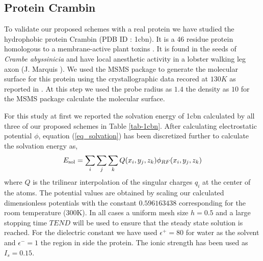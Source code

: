 \subsection{Protein Crambin } To validate our proposed schemes with a real protein we have studied the hydrophobic protein Crambin (PDB ID : 1cbn). It is a 46 residue protein homologous to a membrane-active plant toxins \cite{1cbn_paper}. It is found in the seeds of \textit{Crambe abyssinicia} and have local anesthetic activity in a lobster walking leg axon (J. Marquis \cite{1cbn_paper}). We used the MSMS package to generate the molecular surface for this protein using the crystallographic data recored at $130 K$ as reported in \cite{1cbn_paper}. At this step we used the probe radius as $1.4$ the density as $10$ for the MSMS package calculate the molecular surface.

  For this study at first we reported the solvation energy of 1cbn calculated by all three of our proposed schemes in Table \ref{tab-1cbn}. After calculating electrostatic potential $\phi$, equation (\ref{eq_solvation}) has been discretized further to calculate the solvation energy as, 
 \begin{equation}
 	E_{\rm sol} = \sum_i \sum_j \sum_k Q({x_i,y_j,z_k}) \phi_{RF}(x_i,y_j,z_k)
 \end{equation} 
where $Q$ is the trilinear interpolation of the singular charges $q_i$ at the center of the atoms.  The potential values are obtained by scaling our calculated dimensionless potentials with the constant $0.596163438$ corresponding for the room temperature (300K). In all cases a uniform mesh size $h = 0.5$ and a large stopping time $TEND$ will be used to ensure that the steady state solution is reached. For the dielectric constant we have used $\epsilon^+=80$ for water as the solvent and $\epsilon ^-=1$ the region in side the protein. The ionic strength has been used as $I_s = 0.15$.

